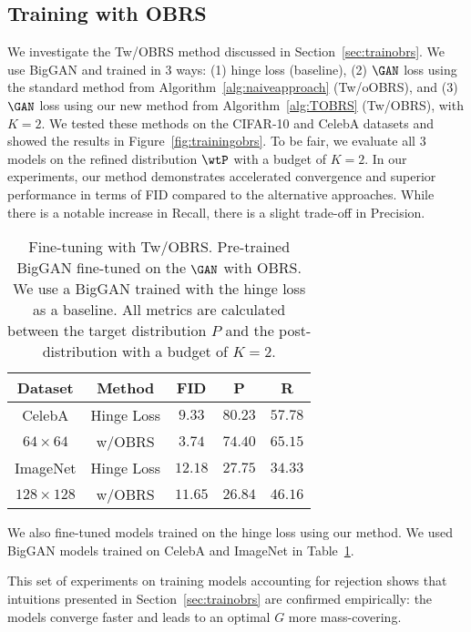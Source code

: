 \documentclass[twoside]{article}
\begin{document}
\subsection{Training with OBRS}
We investigate  the  Tw/OBRS method discussed in Section~\ref{sec:trainobrs}. We use BigGAN and trained in 3 ways: (1) hinge loss (baseline), (2) $\GAN$ loss using the standard method from Algorithm~\ref{alg:naiveapproach} (Tw/oOBRS), and (3) $\GAN$ loss using our new method from Algorithm~\ref{alg:TOBRS} (Tw/OBRS), with $K=2$.
We tested these methods on the  CIFAR-10 and CelebA datasets and showed the results in Figure~\ref{fig:trainingobrs}. To be fair, we evaluate all 3 models on the refined distribution $\wtP$ with a budget of $K=2$. In our experiments, our method demonstrates accelerated convergence and superior performance in terms of FID compared to the alternative approaches. While there is a notable increase in Recall, there is a slight trade-off in Precision.

\begin{table}[t]
    \centering
    \caption{Fine-tuning with Tw/OBRS. Pre-trained BigGAN  fine-tuned on the $\GAN$ with OBRS. We use a BigGAN trained with the hinge loss as a baseline. All metrics are calculated between the target distribution $P$ and the post-distribution with a budget of $K=2$. }
    \label{tab:finetune}
    \begin{tabular}{cc|ccc}
       Dataset & Method & FID & P & R \\\hline
       CelebA  & Hinge Loss & $9.33$ & $\mathbf{80.23}$ & $57
       .78$\\
       $64\times 64$ & w/OBRS & $\mathbf{3.74}$ & $74.40$ & $\mathbf{65.15}$ \\\hline
        ImageNet   & Hinge Loss & $12.18$ & $\mathbf{27.75}$ & $34.33$\\
        $128 \times 128$ & w/OBRS & $\mathbf{11.65}$ & $26.84$ & $\mathbf{46.16}$ \\\hline
    \end{tabular}
\end{table}

We also fine-tuned models trained on the hinge loss using our method. We used BigGAN models trained on CelebA and ImageNet in Table~\ref{tab:finetune}.  

This set of experiments on training models accounting for rejection shows that intuitions presented in Section~\ref{sec:trainobrs} are confirmed empirically: the models converge faster and leads to an optimal $G$ more mass-covering. 
\end{document}
